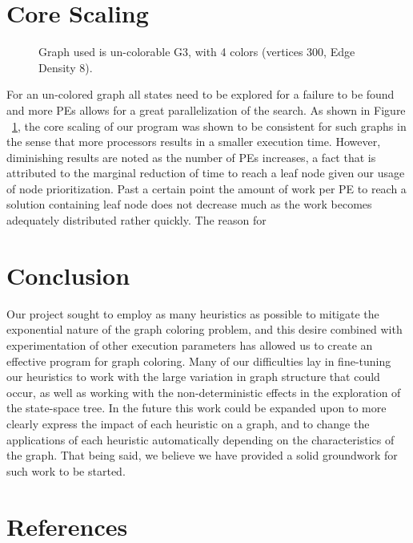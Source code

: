 \documentclass[10pt,twoside]{article}
\begin{document}
\section{Core Scaling}

\begin{figure}
\centering
\caption{Graph used is un-colorable G3, with 4 colors (vertices 300, Edge Density 8).  }
\label{fig_core_scale}
\end{figure}            

  For an un-colored graph all states need to be explored
  for a failure to be found and more PEs allows for a great parallelization of
    the search.
As shown  in Figure ~\ref{fig_core_scale}, the core scaling of our program was
  shown to be consistent for such graphs in the sense that more
  processors results in a smaller execution time. However, diminishing results
  are noted as the number of PEs increases, a fact that is attributed to the
  marginal reduction of time to reach a leaf node given our usage of node
  prioritization. Past a certain point the amount of work per PE to reach a
  solution containing leaf node does not decrease much as the work becomes
  adequately distributed rather quickly.  The reason for 
  


\section{Conclusion}
Our project sought to employ as many heuristics as possible to mitigate the
  exponential nature of the graph coloring problem, and this desire combined
  with experimentation of other execution parameters has allowed us to create
  an effective program for graph coloring. Many of our difficulties lay in
  fine-tuning our heuristics to work with the large variation in graph
  structure that could occur, as well as working with the non-deterministic
  effects in the exploration of the state-space tree. In the future this work
  could be expanded upon to more clearly express the impact of each heuristic
  on a graph, and to change the applications of each heuristic automatically
  depending on the characteristics of the graph. That being said, we believe we
  have provided a solid groundwork for such work to be started.

\section{References}

\nocite{*}

\end{document}
